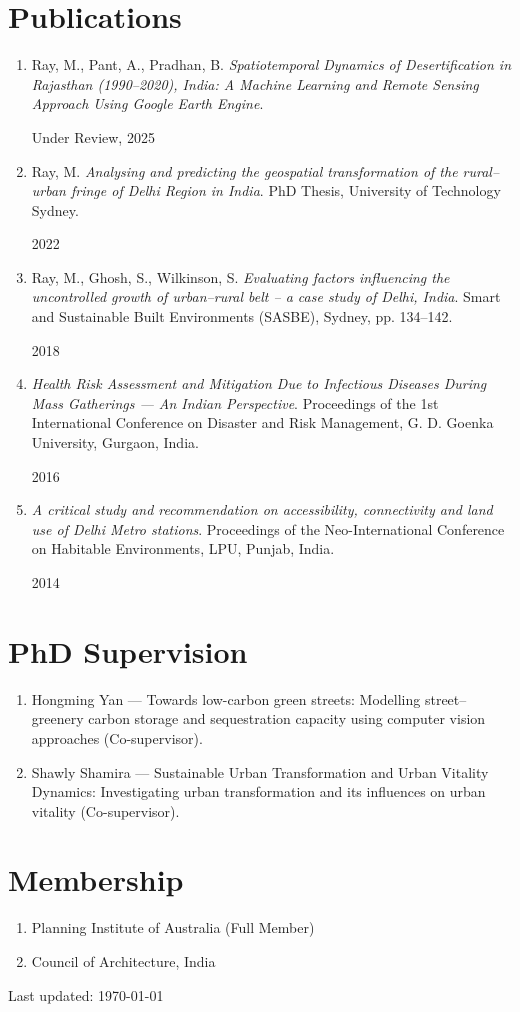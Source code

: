 \documentclass[a4paper,11pt]{article}
\newcommand{\resumePublicationHeading}[2]{%
  \item \begin{minipage}[t]{0.78\textwidth}
    \small #1
  \end{minipage}%
  \hfill%
  \begin{minipage}[t]{0.18\textwidth}
    \raggedleft\small #2
  \end{minipage}\vspace{-7pt}%
}
\newcommand{\resumeSubHeadingListStart}{\begin{enumerate}[leftmargin=0.15in]}
\newcommand{\resumeSubHeadingListEnd}{\end{enumerate}}
\begin{document}
\section{Publications}
  \resumeSubHeadingListStart
    \resumePublicationHeading{Ray, M., Pant, A., Pradhan, B. \emph{Spatiotemporal Dynamics of Desertification in Rajasthan (1990–2020), India: A Machine Learning and Remote Sensing Approach Using Google Earth Engine}.}{Under Review, 2025}
    \resumePublicationHeading{Ray, M. \emph{Analysing and predicting the geospatial transformation of the rural–urban fringe of Delhi Region in India}. PhD Thesis, University of Technology Sydney.}{2022}
    \resumePublicationHeading{Ray, M., Ghosh, S., Wilkinson, S. \emph{Evaluating factors influencing the uncontrolled growth of urban–rural belt – a case study of Delhi, India}. Smart and Sustainable Built Environments (SASBE), Sydney, pp. 134–142.}{2018}
    \resumePublicationHeading{\emph{Health Risk Assessment and Mitigation Due to Infectious Diseases During Mass Gatherings — An Indian Perspective}. Proceedings of the 1st International Conference on Disaster and Risk Management, G. D. Goenka University, Gurgaon, India.}{2016}
    \resumePublicationHeading{\emph{A critical study and recommendation on accessibility, connectivity and land use of Delhi Metro stations}. Proceedings of the Neo-International Conference on Habitable Environments, LPU, Punjab, India.}{2014}
  \resumeSubHeadingListEnd

\section{PhD Supervision}

\begin{enumerate}
    \item Hongming Yan — Towards low-carbon green streets: Modelling street–greenery carbon storage and sequestration capacity using computer vision approaches (Co-supervisor).
    \item Shawly Shamira — Sustainable Urban Transformation and Urban Vitality Dynamics: Investigating urban transformation and its influences on urban vitality (Co-supervisor).
\end{enumerate}


\section{Membership}
\begin{enumerate}
    \item Planning Institute of Australia (Full Member)
    \item Council of Architecture, India
\end{enumerate}

\vspace{2pt}
{\footnotesize Last updated: \today}
\end{document}
